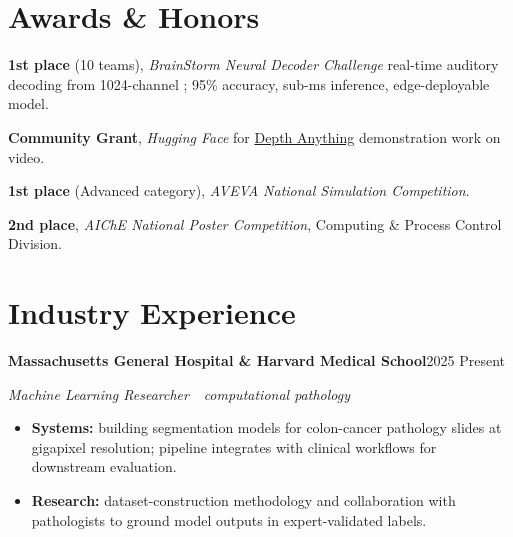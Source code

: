 \documentclass[10pt,letterpaper]{article}
\newcommand{\sansfam}{\sffamily}
\newcommand{\bdash}{\,\textemdash\,}
\newcommand{\datestamp}[1]{{\sansfam\footnotesize\color{meta}\figureversion{lf}#1}}
\newcommand{\role}[2]{%
  \filbreak%
  \par\vspace{1pt}%
  \noindent\textbf{#1}\hfill\datestamp{#2}\par\nopagebreak}
\newcommand{\sub}[1]{\noindent\textit{\footnotesize\color{meta} #1}\par\nopagebreak}
\newcommand{\acro}[1]{\textls[80]{#1}}
\begin{document}
\section{Awards \& Honors}

\begin{list}{}{%
  \setlength{\leftmargin}{3.4em}%
  \setlength{\labelwidth}{2.6em}%
  \setlength{\labelsep}{0.5em}%
  \setlength{\itemsep}{1pt}%
  \setlength{\parsep}{0pt}%
  \setlength{\topsep}{1pt}}
\item[\datestamp{2026}] \textbf{1st place} (10 teams), \textit{BrainStorm Neural Decoder Challenge}\bdash{}real-time auditory decoding from 1024-channel \acro{ECoG}; 95\% accuracy, sub-ms inference, edge-deployable model.
\item[\datestamp{2024}] \textbf{Community Grant}, \textit{Hugging Face}\bdash{}for \href{https://depth-anything.github.io/}{Depth Anything} demonstration work on video.
\item[\datestamp{2019}] \textbf{1st place} (Advanced category), \textit{AVEVA National Simulation Competition}.
\item[\datestamp{2018}] \textbf{2nd place}, \textit{AIChE National Poster Competition}, Computing \& Process Control Division.
\end{list}

\section{Industry Experience}

\role{Massachusetts General Hospital \& Harvard Medical School}{2025 \textendash{} Present}
\sub{Machine Learning Researcher \bdash{} computational pathology}
\begin{itemize}
  \item \textbf{Systems:} building segmentation models for colon-cancer pathology slides at gigapixel resolution; pipeline integrates with clinical workflows for downstream evaluation.
  \item \textbf{Research:} dataset-construction methodology and collaboration with pathologists to ground model outputs in expert-validated labels.
\end{itemize}
\end{document}
